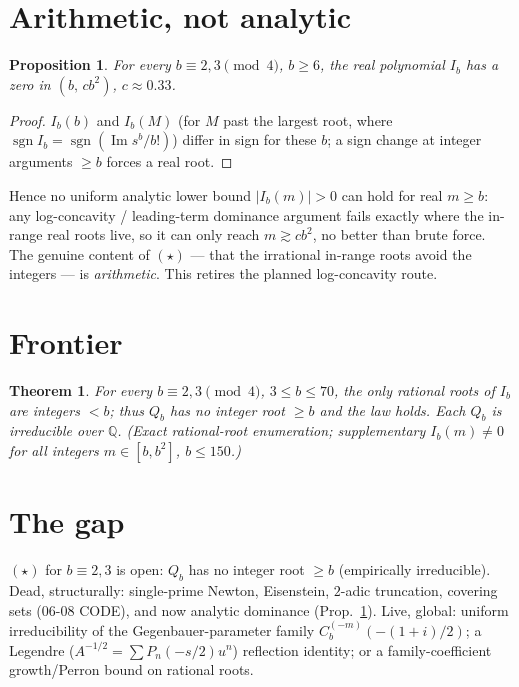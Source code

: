 \documentclass[11pt]{article}
\newtheorem{theorem}{Theorem}
\newtheorem{proposition}{Proposition}
\theoremstyle{definition}
\DeclareMathOperator{\Imag}{Im}
\begin{document}
\section{Arithmetic, not analytic}
\begin{proposition}\label{arith}
For every $b\equiv 2,3\pmod 4$, $b\ge 6$, the real polynomial $I_b$ has a zero in $(b,\,cb^2)$,
$c\approx 0.33$.
\end{proposition}
\begin{proof}
$I_b(b)$ and $I_b(M)$ (for $M$ past the largest root, where $\operatorname{sgn}I_b=\operatorname{sgn}(\Imag s^b/b!)$)
differ in sign for these $b$; a sign change at integer arguments $\ge b$ forces a real root.
\end{proof}
Hence no uniform analytic lower bound $|I_b(m)|>0$ can hold for real $m\ge b$: any log-concavity /
leading-term dominance argument fails exactly where the in-range real roots live, so it can only
reach $m\gtrsim cb^2$, no better than brute force. The genuine content of $(\star)$ --- that the
irrational in-range roots avoid the integers --- is \emph{arithmetic}. This retires the planned
log-concavity route.

\section{Frontier}
\begin{theorem}
For every $b\equiv 2,3\pmod 4$, $3\le b\le 70$, the only rational roots of $I_b$ are integers
$<b$; thus $Q_b$ has no integer root $\ge b$ and the law holds. Each $Q_b$ is irreducible over
$\mathbb Q$. (Exact rational-root enumeration; supplementary $I_b(m)\neq0$ for all integers
$m\in[b,b^2]$, $b\le150$.)
\end{theorem}

\section*{The gap}
$(\star)$ for $b\equiv2,3$ is open: $Q_b$ has no integer root $\ge b$ (empirically irreducible).
Dead, structurally: single-prime Newton, Eisenstein, $2$-adic truncation, covering sets
(06-08 CODE), and now analytic dominance (Prop.~\ref{arith}). Live, global: uniform
irreducibility of the Gegenbauer-parameter family $C_b^{(-m)}(-(1+i)/2)$; a Legendre
($A^{-1/2}=\sum P_n(-s/2)u^n$) reflection identity; or a family-coefficient growth/Perron bound
on rational roots.
\end{document}
